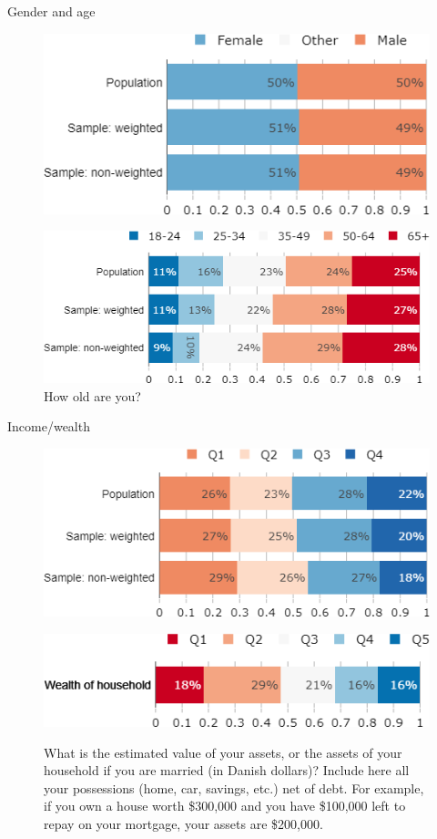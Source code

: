 \documentclass[aspectratio=169,9pt,dvipsnames]{beamer}
\begin{document}
\begin{frame}{Gender and age}%
\begin{figure}[h!]
\centering
\caption{What is your gender?}
\includegraphics[width=.5\textwidth]{../figures/DK/gender_DK_comp.png} \\
\centering
\caption{How old are you?}
\includegraphics[width=.5\textwidth]{../figures/DK/age_DK_comp.png}
\end{figure}
\end{frame}

\begin{frame}{Income/wealth}%
\begin{figure}[h!]
\centering
\captionsetup{justification=centering}
\caption{What was the annual income of your household in 2019 (before withholding tax, for you and those who live with you)?}
\includegraphics[width=.5\textwidth]{../figures/DK/income_DK_comp.png} \\
\vspace{.5cm}
\caption{\small What is the estimated value of your assets, or the assets of your household if you are married (in Danish dollars)? Include here all your possessions (home, car, savings, etc.) net of debt. For example, if you own a house worth \$300,000 and you have \$100,000 left to repay on your mortgage, your assets are \$200,000.}
\includegraphics[width=.5\textwidth]{../figures/DK/wealth_DK.png} \\
\end{figure}
\end{frame}
\end{document}
